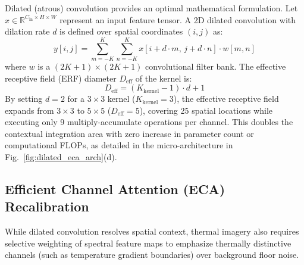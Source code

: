 \documentclass[journal,twoside,web]{ieeecolor}
\begin{document}
Dilated (atrous) convolution provides an optimal mathematical formulation. Let $x \in \mathbb{R}^{C_{\text{in}} \times H \times W}$ represent an input feature tensor. A 2D dilated convolution with dilation rate $d$ is defined over spatial coordinates $(i, j)$ as:
\begin{equation}
y[i, j] = \sum_{m=-K}^{K} \sum_{n=-K}^{K} x[i + d \cdot m,\, j + d \cdot n] \cdot w[m, n]
\label{eq:dilated_conv}
\end{equation}
where $w$ is a $(2K+1)\times(2K+1)$ convolutional filter bank. The effective receptive field (ERF) diameter $D_{\text{eff}}$ of the kernel is:
\begin{equation}
D_{\text{eff}} = (K_{\text{kernel}} - 1) \cdot d + 1
\label{eq:receptive_field}
\end{equation}
By setting $d=2$ for a $3\times3$ kernel ($K_{\text{kernel}}=3$), the effective receptive field expands from $3\times3$ to $5\times5$ ($D_{\text{eff}}=5$), covering 25 spatial locations while executing only 9 multiply-accumulate operations per channel. This doubles the contextual integration area with zero increase in parameter count or computational FLOPs, as detailed in the micro-architecture in Fig.~\ref{fig:dilated_eca_arch}(d).

\subsection{Efficient Channel Attention (ECA) Recalibration}
While dilated convolution resolves spatial context, thermal imagery also requires selective weighting of spectral feature maps to emphasize thermally distinctive channels (such as temperature gradient boundaries) over background floor noise.
\end{document}

